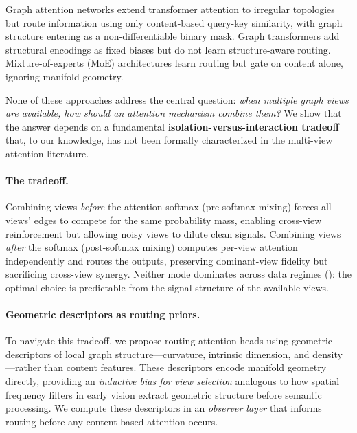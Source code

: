 \documentclass[11pt,a4paper]{article}
\begin{document}
Graph attention networks \citep{velickovic2018graph, brody2022how}
extend transformer attention \citep{vaswani2017attention} to irregular
topologies but route information using only content-based query-key
similarity, with graph structure entering as a non-differentiable binary
mask.
Graph transformers \citep{ying2021transformers, rampasek2022recipe}
add structural encodings as fixed biases but do not learn
structure-aware routing.
Mixture-of-experts (MoE) architectures \citep{shazeer2017outrageously,
fedus2022switch} learn routing but gate on content alone, ignoring
manifold geometry.

None of these approaches address the central question: \emph{when
multiple graph views are available, how should an attention mechanism
combine them?}
We show that the answer depends on a fundamental
\textbf{isolation-versus-interaction tradeoff} that, to our knowledge,
has not been formally characterized in the multi-view attention
literature.

\paragraph{The tradeoff.}
Combining views \emph{before} the attention softmax (pre-softmax mixing)
forces all views' edges to compete for the same probability mass,
enabling cross-view reinforcement but allowing noisy views to dilute
clean signals.
Combining views \emph{after} the softmax (post-softmax mixing) computes
per-view attention independently and routes the outputs, preserving
dominant-view fidelity but sacrificing cross-view synergy.
Neither mode dominates across data regimes
(): the optimal choice is predictable from the signal
structure of the available views.

\paragraph{Geometric descriptors as routing priors.}
To navigate this tradeoff, we propose routing attention heads using
geometric descriptors of local graph structure---curvature, intrinsic
dimension, and density---rather than content features.
These descriptors encode manifold geometry directly, providing an
\emph{inductive bias for view selection} analogous to how spatial
frequency filters in early vision extract geometric structure before
semantic processing.
We compute these descriptors in an \emph{observer layer} that informs
routing before any content-based attention occurs.
\end{document}
